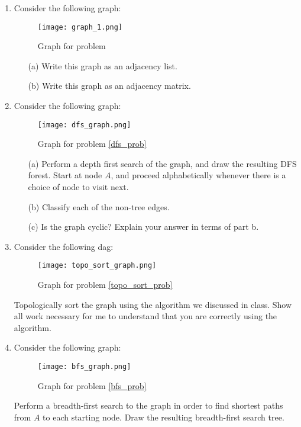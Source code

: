 \documentclass[12pt]{article}
\begin{document}
\begin{enumerate}
    \newpage
    \item Consider the following graph:
    \begin{figure}[h]
        \centering
        \caption{Graph for problem }
        \texttt{[image: graph\_1.png]}
    \end{figure}
    \begin{itemize}
        \item[(a)] Write this graph as an adjacency list.
        \item[(b)] Write this graph as an adjacency matrix.
    \end{itemize}
    \newpage
    \item Consider the following graph: 
    \begin{figure}[h]
        \centering
        \caption{Graph for problem \ref{dfs_prob}}
        \texttt{[image: dfs\_graph.png]}
    \end{figure}
    \begin{itemize}
        \item[(a)] Perform a depth first search of the graph, and draw the resulting DFS forest. Start at node $A$, and proceed alphabetically whenever there is a choice of node to visit next. 
        \item[(b)] Classify each of the non-tree edges.  
        \item[(c)] Is the graph cyclic? Explain your answer in terms of part b. 
    \end{itemize}
    \label{dfs_prob}
    \newpage
    \item Consider the following dag:
    \begin{figure}[h]
        \centering
        \caption{Graph for problem \ref{topo_sort_prob}}
        \texttt{[image: topo\_sort\_graph.png]}
    \end{figure}
    Topologically sort the graph using the algorithm we discussed in class. Show all work necessary for me to understand that you are correctly using the algorithm. 
    \label{topo_sort_prob}
    \newpage
    \item Consider the following graph: \label{bfs}
    \begin{figure}[h]
        \centering
        \caption{Graph for problem \ref{bfs_prob}}
        \texttt{[image: bfs\_graph.png]}
    \end{figure}
     Perform a breadth-first search to the graph in order to find shortest paths from $A$ to each starting node. Draw the resulting breadth-first search tree. 

\end{enumerate}
\end{document}
